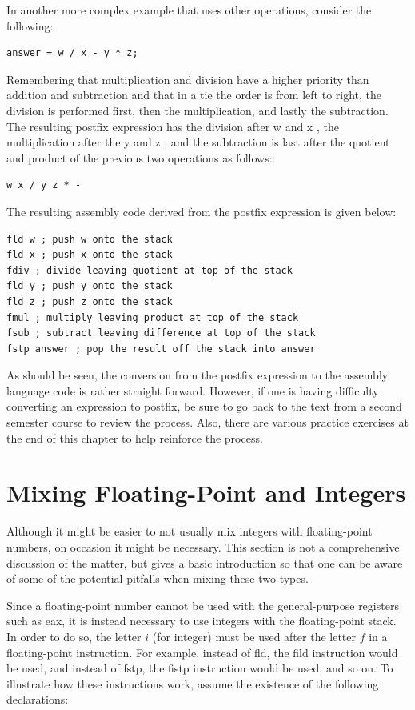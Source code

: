 \documentclass[10pt]{book}
\begin{document}
In another more complex example that uses other operations, consider the following:

\begin{verbatim}
answer = w / x - y * z;
\end{verbatim}

Remembering that multiplication and division have a higher priority than addition and subtraction and that in a tie the order is from left to right, the division is performed first, then the multiplication, and lastly the subtraction. The resulting postfix expression has the division after w and x , the multiplication after the y and z , and the subtraction is last after the quotient and product of the previous two operations as follows:

\begin{verbatim}
w x / y z * -
\end{verbatim}

The resulting assembly code derived from the postfix expression is given below:

\begin{verbatim}
fld w ; push w onto the stack
fld x ; push x onto the stack
fdiv ; divide leaving quotient at top of the stack
fld y ; push y onto the stack
fld z ; push z onto the stack
fmul ; multiply leaving product at top of the stack
fsub ; subtract leaving difference at top of the stack
fstp answer ; pop the result off the stack into answer
\end{verbatim}

As should be seen, the conversion from the postfix expression to the assembly language code is rather straight forward. However, if one is having difficulty converting an expression to postfix, be sure to go back to the text from a second semester course to review the process. Also, there are various practice exercises at the end of this chapter to help reinforce the process.

\section{Mixing Floating-Point and Integers}
Although it might be easier to not usually mix integers with floating-point numbers, on occasion it might be necessary. This section is not a comprehensive discussion of the matter, but gives a basic introduction so that one can be aware of some of the potential pitfalls when mixing these two types.

Since a floating-point number cannot be used with the general-purpose registers such as eax, it is instead necessary to use integers with the floating-point stack. In order to do so, the letter $i$ (for integer) must be used after the letter $f$ in a floating-point instruction. For example, instead of fld, the fild instruction would be used, and instead of fstp, the fistp instruction would be used, and so on. To illustrate how these instructions work, assume the existence of the following declarations:
\end{document}

